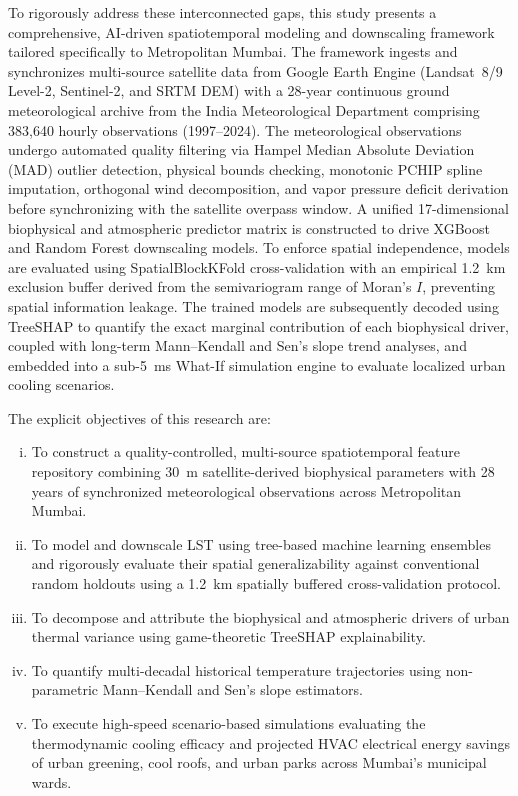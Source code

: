 \documentclass[a4paper,fleqn]{cas-sc}
\begin{document}
To rigorously address these interconnected gaps, this study presents a comprehensive, AI-driven spatiotemporal modeling and downscaling framework tailored specifically to Metropolitan Mumbai. The framework ingests and synchronizes multi-source satellite data from Google Earth Engine (Landsat~8/9 Level-2, Sentinel-2, and SRTM DEM) with a 28-year continuous ground meteorological archive from the India Meteorological Department comprising 383,640 hourly observations (1997--2024). The meteorological observations undergo automated quality filtering via Hampel Median Absolute Deviation (MAD) outlier detection, physical bounds checking, monotonic PCHIP spline imputation, orthogonal wind decomposition, and vapor pressure deficit derivation before synchronizing with the satellite overpass window. A unified 17-dimensional biophysical and atmospheric predictor matrix is constructed to drive XGBoost and Random Forest downscaling models. To enforce spatial independence, models are evaluated using SpatialBlockKFold cross-validation with an empirical 1.2~km exclusion buffer derived from the semivariogram range of Moran's $I$, preventing spatial information leakage. The trained models are subsequently decoded using TreeSHAP to quantify the exact marginal contribution of each biophysical driver, coupled with long-term Mann--Kendall and Sen's slope trend analyses, and embedded into a sub-5~ms What-If simulation engine to evaluate localized urban cooling scenarios.

The explicit objectives of this research are:
\begin{enumerate}[(i)]
    \item To construct a quality-controlled, multi-source spatiotemporal feature repository combining 30~m satellite-derived biophysical parameters with 28 years of synchronized meteorological observations across Metropolitan Mumbai.
    \item To model and downscale LST using tree-based machine learning ensembles and rigorously evaluate their spatial generalizability against conventional random holdouts using a 1.2~km spatially buffered cross-validation protocol.
    \item To decompose and attribute the biophysical and atmospheric drivers of urban thermal variance using game-theoretic TreeSHAP explainability.
    \item To quantify multi-decadal historical temperature trajectories using non-parametric Mann--Kendall and Sen's slope estimators.
    \item To execute high-speed scenario-based simulations evaluating the thermodynamic cooling efficacy and projected HVAC electrical energy savings of urban greening, cool roofs, and urban parks across Mumbai's municipal wards.
\end{enumerate}
\end{document}
